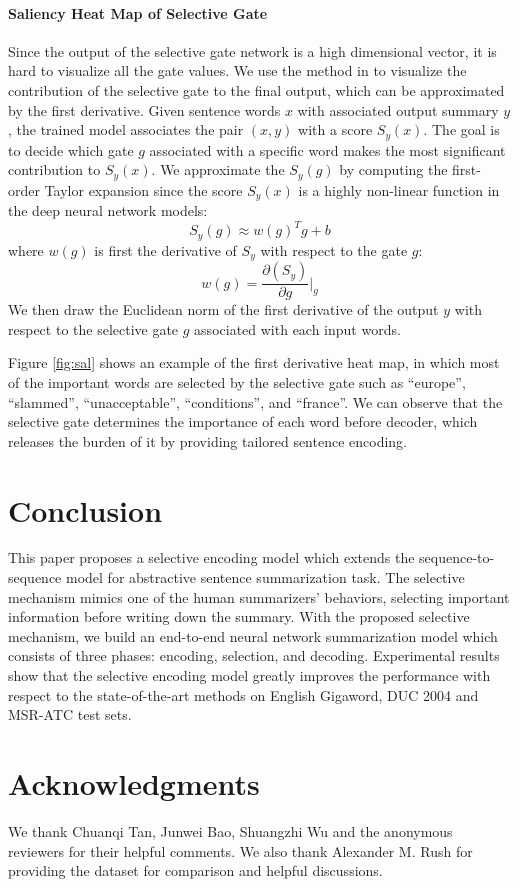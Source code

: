\documentclass[11pt,a4paper]{article}
\begin{document}
\paragraph{Saliency Heat Map of Selective Gate}
Since the output of the selective gate network is a high dimensional vector, it is hard to visualize all the gate values.
We use the method in \citet{jiweiliNaacl} to visualize the contribution of the selective gate to the final output, which can be approximated by the first derivative.
Given sentence words $ x $ with associated output summary $ y $, the trained model associates the pair $ (x, y) $ with a score $ S_{y}(x) $.
The goal is to decide which gate $ g $ associated with a specific word makes the most significant contribution to $ S_{y}(x) $.
We approximate the $ S_{y}(g) $ by computing the first-order Taylor expansion since the score $ S_{y}(x) $ is a highly non-linear function in the deep neural network models:
\begin{equation}
S_{y}(g) \approx w(g)^{T} g + b
\end{equation}
where $ w(g) $ is first the derivative of $ S_{y} $ with respect to the gate $ g $:
\begin{equation}
w(g) = \frac{\partial(S_{y})}{\partial g} |_{g}
\end{equation}
We then draw the Euclidean norm of the first derivative of the output $ y $ with respect to the selective gate $ g $ associated with each input words.

Figure \ref{fig:sal} shows an example of the first derivative heat map, in which most of the important words are selected by the selective gate such as ``europe'', ``slammed'', ``unacceptable'', ``conditions'', and ``france''.
We can observe that the selective gate determines the importance of each word before decoder, which releases the burden of it by providing tailored sentence encoding.
 


\section{Conclusion}
This paper proposes a selective encoding model which extends the sequence-to-sequence model for abstractive sentence summarization task.
The selective mechanism mimics one of the human summarizers' behaviors, selecting important information before writing down the summary.
With the proposed selective mechanism, we build an end-to-end neural network summarization model which consists of three phases: encoding, selection, and decoding.
Experimental results show that the selective encoding model greatly improves the performance with respect to the state-of-the-art methods on English Gigaword, DUC 2004 and MSR-ATC test sets.


\section*{Acknowledgments}

We thank Chuanqi Tan, Junwei Bao, Shuangzhi Wu and the anonymous reviewers for their helpful comments.
We also thank Alexander M. Rush for providing the dataset for comparison and helpful discussions.
 


\end{document}
